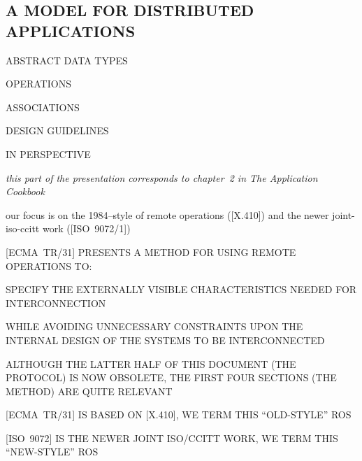 
\begin{bwslide}
\part	{A MODEL FOR DISTRIBUTED APPLICATIONS}\bf

\begin{nrtc}
\item	ABSTRACT DATA TYPES

\item	OPERATIONS

\item	ASSOCIATIONS

\item	DESIGN GUIDELINES

\item	IN PERSPECTIVE
\end{nrtc}
\end{bwslide}


\begin{note}\em
this part of the presentation corresponds to chapter~2 in The Application
Cookbook

our focus is on the 1984--style of remote operations ([X.410])
and the newer joint-iso-ccitt work ([ISO~9072/1])
\end{note}


\begin{bwslide}

\begin{nrtc}
\item	{}[ECMA~TR/31] PRESENTS A METHOD FOR USING REMOTE OPERATIONS TO:
    \begin{nrtc}
    \item	SPECIFY THE EXTERNALLY VISIBLE CHARACTERISTICS
		NEEDED FOR INTERCONNECTION

    \item	WHILE AVOIDING UNNECESSARY CONSTRAINTS UPON THE
		INTERNAL DESIGN OF THE SYSTEMS TO BE INTERCONNECTED
    \end{nrtc}

\item	ALTHOUGH THE LATTER HALF OF THIS DOCUMENT (THE PROTOCOL) IS NOW
	OBSOLETE, THE FIRST FOUR SECTIONS (THE METHOD) ARE QUITE RELEVANT

\item	{}[ECMA~TR/31] IS BASED ON [X.410],
	WE TERM THIS ``OLD-STYLE'' ROS

\item	{}[ISO~9072] IS THE NEWER JOINT ISO/CCITT WORK,
	WE TERM THIS ``NEW-STYLE'' ROS
\end{nrtc}
\end{bwslide}


